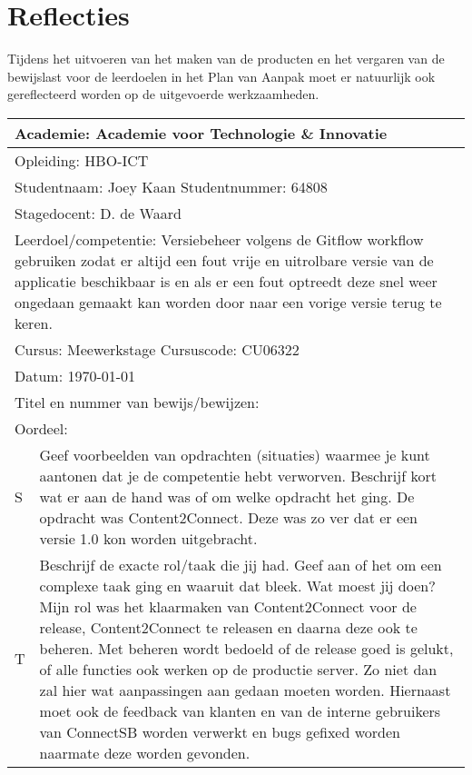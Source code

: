 \section{Reflecties}
Tijdens het uitvoeren van het maken van de producten en het vergaren van de bewijslast voor de leerdoelen in het Plan van Aanpak moet er natuurlijk ook gereflecteerd worden op de uitgevoerde werkzaamheden.

\begin{tabularx}{\textwidth}{| l | X |}
\hline
\multicolumn{2}{|l|}{Academie: Academie voor Technologie \& Innovatie } \\ 
\hline
\multicolumn{2}{|l|}{Opleiding: HBO-ICT } \\ 
\hline
\multicolumn{2}{|l|}{Studentnaam: Joey Kaan \hspace{35pt} Studentnummer: 64808} \\
\hline
\multicolumn{2}{|l|}{Stagedocent: D. de Waard} \\ 
\hline
\multicolumn{2}{|p{\textwidth-1in}|}{Leerdoel/competentie: Versiebeheer volgens de Gitflow workflow gebruiken zodat er
altijd een fout vrije en uitrolbare versie van de applicatie beschikbaar is en als
er een fout optreedt deze snel weer ongedaan gemaakt kan worden door naar
een vorige versie terug te keren.} \\
\hline
\multicolumn{2}{|l|}{Cursus: Meewerkstage \hspace{35pt} Cursuscode: CU06322} \\
\hline
\multicolumn{2}{|l|}{Datum: \today} \\
\hline
\multicolumn{2}{|l|}{Titel en nummer van bewijs/bewijzen: } \\ [50pt]
\hline
\multicolumn{2}{|l|}{Oordeel: } \\
\hline
S & Geef voorbeelden van opdrachten (situaties) waarmee je kunt aantonen dat je de competentie hebt verworven. Beschrijf kort wat er aan de hand was of om welke opdracht het ging. 
\newline
De opdracht was Content2Connect. Deze was zo ver dat er een versie 1.0 kon worden uitgebracht. \\ 
\hline
T & Beschrijf de exacte rol/taak die jij had. Geef aan of het om een complexe taak ging en waaruit dat bleek. Wat moest jij doen?
\newline
Mijn rol was het klaarmaken van Content2Connect voor de release, Content2Connect te releasen en daarna deze ook te beheren. Met beheren wordt bedoeld of de release goed is gelukt, of alle functies ook werken op de productie server. Zo niet dan zal hier wat aanpassingen aan gedaan moeten worden. Hiernaast moet ook de feedback van klanten en van de interne gebruikers van ConnectSB worden verwerkt en bugs gefixed worden naarmate deze worden gevonden.

\end{tabularx}
